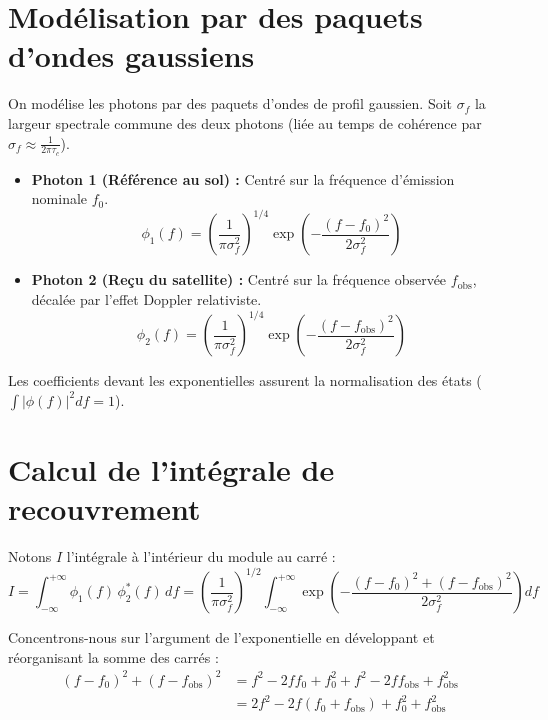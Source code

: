 \documentclass[11pt,a4paper]{article}
\begin{document}
\section{Modélisation par des paquets d'ondes gaussiens}
On modélise les photons par des paquets d'ondes de profil gaussien. Soit $\sigma_f$ la largeur spectrale commune des deux photons (liée au temps de cohérence par $\sigma_f \approx \frac{1}{2\pi\tau_c}$).

\begin{itemize}
    \item \textbf{Photon 1 (Référence au sol) :} Centré sur la fréquence d'émission nominale $f_0$.
    \begin{equation}
        \phi_1(f) = \left(\frac{1}{\pi \sigma_f^2}\right)^{1/4} \exp\left( - \frac{(f - f_0)^2}{2\sigma_f^2} \right)
    \end{equation}
    
    \item \textbf{Photon 2 (Reçu du satellite) :} Centré sur la fréquence observée $f_{\text{obs}}$, décalée par l'effet Doppler relativiste.
    \begin{equation}
        \phi_2(f) = \left(\frac{1}{\pi \sigma_f^2}\right)^{1/4} \exp\left( - \frac{(f - f_{\text{obs}})^2}{2\sigma_f^2} \right)
    \end{equation}
\end{itemize}
Les coefficients devant les exponentielles assurent la normalisation des états ($\int |\phi(f)|^2 df = 1$).

\section{Calcul de l'intégrale de recouvrement}
Notons $I$ l'intégrale à l'intérieur du module au carré :
\begin{equation}
    I = \int_{-\infty}^{+\infty} \phi_1(f)\,\phi_2^*(f) \, df = \left(\frac{1}{\pi \sigma_f^2}\right)^{1/2} \int_{-\infty}^{+\infty} \exp\left( - \frac{(f - f_0)^2 + (f - f_{\text{obs}})^2}{2\sigma_f^2} \right) df
\end{equation}

Concentrons-nous sur l'argument de l'exponentielle en développant et réorganisant la somme des carrés :
\begin{align}
    (f - f_0)^2 + (f - f_{\text{obs}})^2 &= f^2 - 2ff_0 + f_0^2 + f^2 - 2ff_{\text{obs}} + f_{\text{obs}}^2 \nonumber \\
    &= 2f^2 - 2f(f_0 + f_{\text{obs}}) + f_0^2 + f_{\text{obs}}^2
\end{align}
\end{document}
